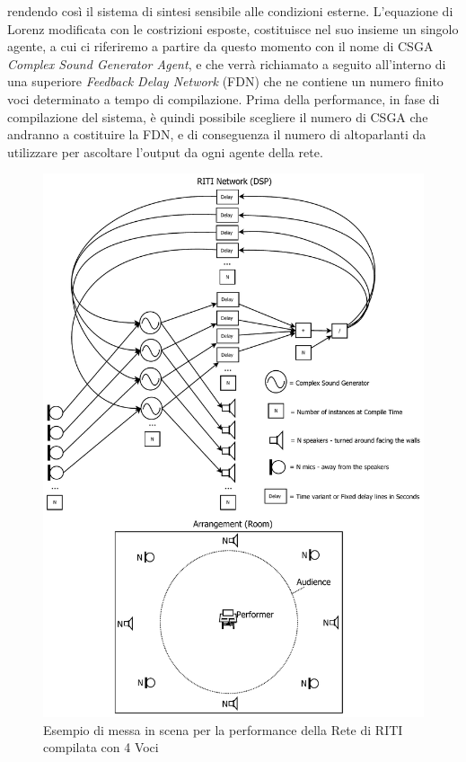 rendendo così il sistema di sintesi sensibile alle condizioni esterne.
L'equazione di Lorenz modificata con le costrizioni esposte,
costituisce nel suo insieme un singolo agente, a cui ci riferiremo a partire da questo
momento con il nome di CSGA \textit{Complex Sound Generator Agent}, e che verrà richiamato a seguito
all'interno di una superiore \textit{Feedback Delay Network} (FDN) che ne contiene un 
numero finito voci determinato a tempo di compilazione. 
Prima della performance, in fase di compilazione del sistema,
è quindi possibile scegliere il numero di CSGA che andranno a costituire 
la FDN, e di conseguenza il numero di altoparlanti da utilizzare
per ascoltare l'output da ogni agente della rete.

\clearpage

\begin{figure}[h!]
    \begin{center}
        \includegraphics[width=12cm]{figures/RITIarranegment.pdf} 
        \caption {Esempio di messa in scena per la performance della Rete di RITI compilata con 4 Voci}
    \end{center}
    \end{figure}


